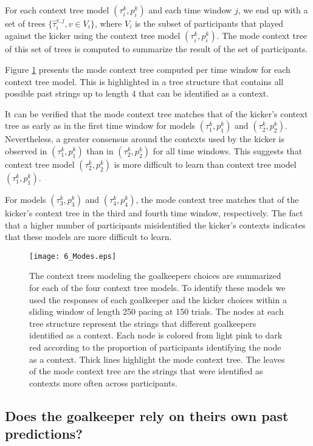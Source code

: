 \documentclass[fleqn,10pt]{wlscirep}
\begin{document}
For each context tree model $(\tau^k_i, p_i^k)$ and each time window $j$, we end up with a set of trees $\{\hat{\tau}^{v,j}_i, v \in V_i\}$, where $V_i$ is the subset of participants that played against the kicker using the context tree model $(\tau^k_i, p_i^k)$. The mode context tree \cite{Hernandez2021} of this set of trees is computed to summarize the result of the set of participants.

Figure \ref{fig:modecontexttree} presents the mode context tree computed per time window for each context tree model. This is highlighted in a tree structure that contains all possible past strings up to length 4 that can be identified as a context. 

It can be verified that the mode context tree matches that of the kicker’s context tree as early as in the first time window for models $(\tau_1^k, p_1^k)$ and $(\tau_2^k,p_2^k)$. Nevertheless, a greater consensus around the contexts used by the kicker is observed in $(\tau_1^k, p_1^k)$ than in $(\tau_2^k,p_2^k)$ for all time windows. This suggests that context tree model $(\tau_2^k,p_2^k)$ is more difficult to learn than context tree model $(\tau_1^k, p_1^k)$.  

For models $(\tau_3^k, p_3^k)$ and $(\tau_4^k,p_4^k)$, the mode context tree matches that of the kicker’s context tree in the third and fourth time window, respectively. The fact that a higher number of participants misidentified the kicker's contexts indicates that these models are more difficult to learn. 

\begin{figure}[h!]
	\centering
	\texttt{[image: 6\_Modes.eps]}
	\caption{The context trees modeling the goalkeepers choices are summarized for each of the four context tree models. To identify these models we used the responses of each goalkeeper and the kicker choices within a sliding window of length 250 pacing at 150 trials. The nodes at each tree structure represent the strings that different goalkeepers identified as a context. Each node is colored from light pink to dark red according to the proportion of participants identifying the node as a context. Thick lines highlight the mode context tree. The leaves of the mode context tree are the strings that were identified as contexts more often across participants.}
	\label{fig:modecontexttree}
\end{figure}
\FloatBarrier

\subsection*{Does the goalkeeper rely on theirs own past predictions?}
\end{document}
